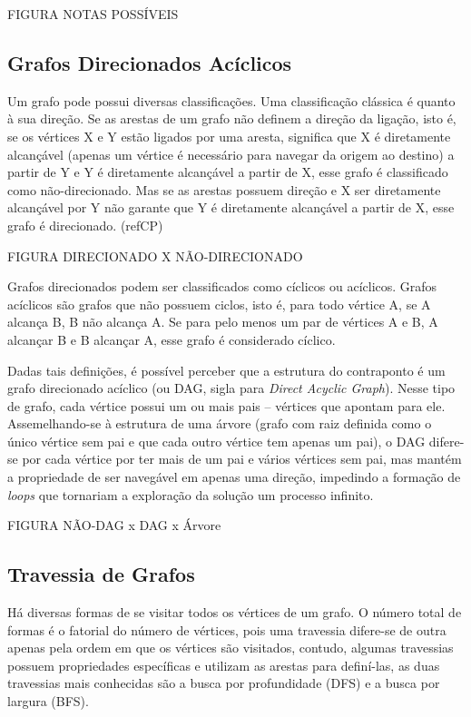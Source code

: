     FIGURA NOTAS POSSÍVEIS

    \subsection[Grafos Direcionados Acíclicos]{Grafos Direcionados Acíclicos}

      Um grafo pode possui diversas classificações. Uma classificação clássica é quanto à sua direção. Se as arestas de um grafo não definem a direção da ligação, isto é, se os vértices X e Y estão ligados por uma aresta, significa que X é diretamente alcançável (apenas um vértice é necessário para navegar da origem ao destino) a partir de Y e Y é diretamente alcançável a partir de X, esse grafo é classificado como não-direcionado. Mas se as arestas possuem direção e X ser diretamente alcançável por Y não garante que Y é diretamente alcançável a partir de X, esse grafo é direcionado. (refCP)

      FIGURA DIRECIONADO X NÃO-DIRECIONADO

      Grafos direcionados podem ser classificados como cíclicos ou acíclicos. Grafos acíclicos são grafos que não possuem ciclos, isto é, para todo vértice A, se A alcança B, B não alcança A. Se para pelo menos um par de vértices A e B, A alcançar B e B alcançar A, esse grafo é considerado cíclico.

      Dadas tais definições, é possível perceber que a estrutura do contraponto é um grafo direcionado acíclico (ou DAG, sigla para \textit{Direct Acyclic Graph}). Nesse tipo de grafo, cada vértice possui um ou mais pais -- vértices que apontam para ele. Assemelhando-se à estrutura de uma árvore (grafo com raiz definida como o único vértice sem pai e que cada outro vértice tem apenas um pai), o DAG difere-se por cada vértice por ter mais de um pai e vários vértices sem pai, mas mantém a propriedade de ser navegável em apenas uma direção, impedindo a formação de \textit{loops} que tornariam a exploração da solução um processo infinito.

      FIGURA NÃO-DAG x DAG x Árvore

    \subsection[Travessia de Grafos]{Travessia de Grafos}

      Há diversas formas de se visitar todos os vértices de um grafo. O número total de formas é o fatorial do número de vértices, pois uma travessia difere-se de outra apenas pela ordem em que os vértices são visitados, contudo, algumas travessias possuem propriedades específicas e utilizam as arestas para definí-las, as duas travessias mais conhecidas são a busca por profundidade (DFS) e a busca por largura (BFS).


